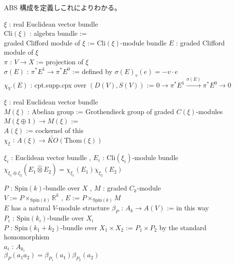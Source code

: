 \documentclass[dvipdfmx]{jsarticle}
\begin{document}
ABS 構成を定義しこれによりわかる。

\begin{Definition}
\itemdefi
  \For \(\xi\) : real Euclidean vector bundle \\
  \Define \(\text{Cli}(\xi)\) : algebra bundle :=  \\
  \Define graded Clifford module of \(\xi\) := \(\text{Cli}(\xi)\)-module bundle
\itemdefi
  \For \(E\) : graded Clifford module of \(\xi\) \\
  \Let \(\pi\) : \(V \to X\) := projection of \(\xi\) \\
  \Define \(\sigma(E)\) : \(\pi^* E^1 \to \pi^* E^0\) := defined by \(\sigma(E)_v(e) = -v \cdot e\) \\
  \Define \(\chi_V(E)\) : cpt.supp.cpx over \((D(V), S(V))\) := \(0 \to \pi^* E^1 \overset{\sigma(E)}{\to} \pi^* E^0 \to 0\)
\end{Definition}

\begin{Definition}
\itemdefi
  \For \(\xi\) : real Euclidean vector bundle \\
  \Define \(M(\xi)\) : Abelian group := Grothendieck group of graded \(C(\xi)\)-modules \\
  \Let \(M(\xi \oplus 1) \to M(\xi)\) := \WIP \\
  \Define \(A(\xi)\) := cockernel of this \\
  \Define \(\chi_{\xi}\) : \(A(\xi) \to \tilde{KO}(\text{Thom}(\xi))\) 
\end{Definition}

\begin{Theorem}
\itemprop
  \For \(\xi_i\) : Euclidean vector bundle , \(E_i\) : \(\text{Cli}(\xi_i)\)-module bundle \\
  \(\chi_{\xi_1 \oplus \xi_2}(E_1 \hat{\otimes} E_2) = \chi_{\xi_1}(E_1) \chi_{\xi_2}(E_2)\)
\end{Theorem}

\begin{Theorem}
\itemprop
  \For \(P\) : \(\text{Spin}(k)\)-bundle over \(X\) , \(M\) : graded \(C_k\)-module \\
  \Let \(V\) := \(P \times_{\text{Spin}(k)} \mathbb{R}^k\) , \(E\) := \(P \times_{\text{Spin}(k)} M\) \\
  \Then \(E\) has a natural \(V\)-module structure
\itemdefi
  \Define \(\beta_P\) : \(A_k \to A(V)\) := in this way \\
\itemprop
  \For \(P_i\) : \(\text{Spin}(k_i)\)-bundle over \(X_i\) \\
  \Let \(P\) : \(\text{Spin}(k_1 + k_2)\)-bundle over \(X_1 \times X_2\) := \(P_1 \times P_2\) by the standard homomorphism \\
  \For \(a_i\) : \(A_{k_i}\) \\
  \Then \(\beta_P(a_1 a_2) = \beta_{P_1}(a_1) \beta_{P_2}(a_2)\)
\end{Theorem}
\end{document}
